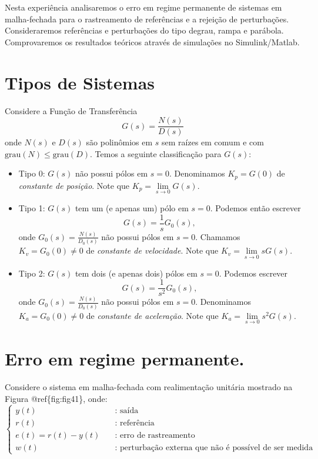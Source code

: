 \documentclass[
]{book}
\providecommand{\tightlist}{%
  \setlength{\itemsep}{0pt}\setlength{\parskip}{0pt}}
\theoremstyle{definition}
\theoremstyle{definition}
\theoremstyle{definition}
\theoremstyle{remark}
\begin{document}
Nesta experiência analisaremos o erro em regime permanente de sistemas em malha-fechada para o rastreamento de referências e a rejeição de perturbações. Consideraremos referências e perturbações do tipo degrau, rampa e parábola. Comprovaremos os resultados teóricos através de simulações no Simulink/Matlab.

\hypertarget{tipos-de-sistemas}{%
\section{Tipos de Sistemas}\label{tipos-de-sistemas}}

Considere a Função de Transferência
\[
G(s) = \frac {N(s)}{D(s)}
\]
onde \(N(s)\) e \(D(s)\) são polinômios em \(s\) sem raízes em comum e com \(\text{grau}(N) \leq \text{grau}(D)\). Temos a seguinte classificação para \(G(s)\):

\begin{itemize}
\tightlist
\item
  Tipo 0: \(G(s)\) não possui pólos em \(s=0\). Denominamos \(K_p = G(0)\) de \emph{constante de posição}. Note que \(K_p = \lim\limits_{s \to 0} G(s)\).
\item
  Tipo 1: \(G(s)\) tem um (e apenas um) pólo em \(s=0\). Podemos então escrever \[G(s) = \frac {1}{s}G_0(s),\] onde \(G_0(s) = \frac {N(s)}{D_0(s)}\) não possui pólos em \(s=0\). Chamamos \(K_v= G_0(0) \neq 0\) de \emph{constante de velocidade}. Note que \(K_v = \lim\limits_{s \to 0} sG(s)\).
\item
  Tipo 2: \(G(s)\) tem dois (e apenas dois) pólos em \(s=0\). Podemos escrever \[G(s) = \frac {1}{s^2}G_0(s),\] onde \(G_0(s) = \frac {N(s)}{D_0(s)}\) não possui pólos em \(s=0\). Denominamos \(K_a = G_0(0) \neq 0\) de \emph{constante de aceleração}. Note que \(K_a =\lim\limits_{s \to 0} s^2G(s)\).
\end{itemize}

\hypertarget{erro-em-regime-permanente.}{%
\section{Erro em regime permanente.}\label{erro-em-regime-permanente.}}

Considere o sistema em malha-fechada com realimentação unitária mostrado na Figura @ref\{fig:fig41\}, onde:
\[
\begin{cases}
  y(t) & \quad \text{: saída}\\
  r(t) & \quad \text{: referência}\\
  e(t) = r(t)-y(t) & \quad \text{: erro de rastreamento}\\
  w(t) &\quad \text{: perturbação externa que não é possível de ser medida}
\end{cases}
\]
\end{document}
